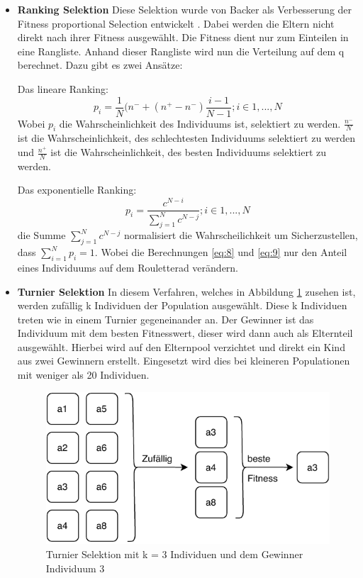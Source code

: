\begin{itemize}
\item \textbf{Ranking Selektion} Diese Selektion wurde von Backer als Verbesserung der Fitness proportional Selection entwickelt \cite{baker1985adaptive}. Dabei werden die Eltern nicht direkt nach ihrer Fitness ausgewählt. Die Fitness dient nur zum Einteilen in eine Rangliste. Anhand dieser Rangliste wird nun die Verteilung auf dem q berechnet. Dazu gibt es zwei Ansätze:

Das lineare Ranking:
\begin{equation}	
	p_i = \frac{1}{N}(n^- + (n^+ - n^- ) \frac{i-1}{N-1}; i\in{1,...,N} \label{eq:8}
\end{equation}
Wobei $p_i$ die Wahrscheinlichkeit des Individuums ist, selektiert zu werden. $\frac{n^-}{N}$ ist die Wahrscheinlichkeit, des schlechtesten Individuums selektiert zu werden und  $\frac{n^+}{N}$ ist die Wahrscheinlichkeit, des besten Individuums selektiert zu werden.

Das exponentielle Ranking:
\begin{equation}
	p_i = \frac{c^{N-i}}{\sum_{j=1}^N c^{N-j}}; i\in{1,...,N} \label{eq:9}
\end{equation}
die Summe $\sum_{j=1}^N c^{N-j}$ normalisiert die Wahrscheilichkeit um Sicherzustellen, dass $\sum_{i=1}^N p_i = 1$.
Wobei die Berechnungen \ref{eq:8} und \ref{eq:9} nur den Anteil eines Individuums auf dem Rouletterad verändern.

\item \textbf{Turnier Selektion} In diesem Verfahren, welches in Abbildung \ref{fig:tunier} zusehen ist, werden zufällig k Individuen der Population ausgewählt. Diese k Individuen treten wie in einem Turnier gegeneinander an. Der Gewinner ist das Individuum mit dem besten Fitnesswert, dieser wird dann auch als Elternteil ausgewählt. Hierbei wird auf den Elternpool verzichtet und direkt ein Kind aus zwei Gewinnern erstellt. Eingesetzt wird dies bei kleineren Populationen mit weniger als 20 Individuen.

\begin{figure}[htb]
  \centering  
  \includegraphics[scale=0.8]{img/tunier.pdf}
  \caption{Turnier Selektion mit k = 3 Individuen und dem Gewinner Individuum 3}
  \label{fig:tunier}
\end{figure}


\end{itemize}



